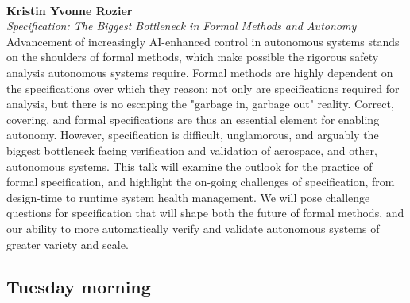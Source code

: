 \documentclass{article}
\newcounter{talkc}
\newcommand{\talk}[3]{\stepcounter{talkc}
\vspace{0.5em}~\\
\noindent
\textbf{#1}\\ 
\noindent\emph{#2}\\ 
\noindent#3\\
}
\begin{document}
\talk{Kristin Yvonne Rozier}{Specification: The Biggest Bottleneck in Formal Methods and Autonomy}{Advancement of increasingly AI-enhanced control in autonomous systems stands on the shoulders of formal methods, which make possible the rigorous safety analysis autonomous systems require. Formal methods are highly dependent on the specifications over which they reason; not only are specifications required for analysis, but there is no escaping the "garbage in, garbage out" reality. Correct, covering, and formal specifications are thus an essential element for enabling autonomy. However, specification is difficult, unglamorous, and arguably the biggest bottleneck facing verification and validation of aerospace, and other, autonomous systems. This talk will examine the outlook for the practice of formal specification, and highlight the on-going challenges of specification, from design-time to runtime system health management. We will pose challenge questions for specification that will shape both the future of formal methods, and our ability to more automatically verify and validate autonomous systems of greater variety and scale.}

\subsection*{Tuesday morning}
\end{document}
